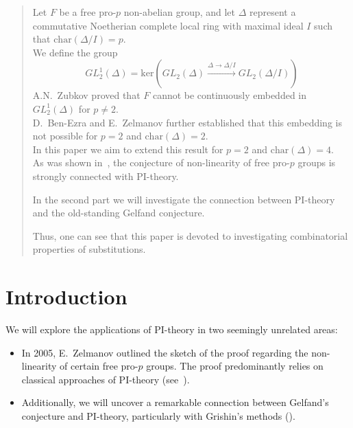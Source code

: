 \documentclass[12pt,a4paper]{article}
\begin{document}
    \begin{abstract}
        Let $F$ be a free pro-$p$ non-abelian group, and let $\Delta$ represent a commutative Noetherian complete local ring with maximal ideal $I$ such that
        $\mathrm{char}(\Delta/I)=p$.\\
        We define the group
        \[GL_2^1(\Delta) = \mathrm{ker}\left( GL_2(\Delta) \xrightarrow{\Delta\to\Delta/I} GL_2(\Delta/I) \right)\]
        A.N.\ Zubkov proved that $F$ cannot be continuously embedded in $GL_2^1(\Delta)$ for $p\neq 2$.\\
        D.\ Ben-Ezra and E.\ Zelmanov further established that this embedding is not possible for $p = 2$ and $\mathrm{char}(\Delta) = 2$.\\
        In this paper we aim to extend this result for $p=2$ and $\mathrm{char}(\Delta)=4$.\\
        As was shown in~\cite{Zelmanov1}, the conjecture of non-linearity of free pro-$p$ groups is strongly connected with PI-theory.

        In the second part we will investigate the connection between PI-theory and the old-standing Gelfand conjecture.

        Thus, one can see that this paper is devoted to investigating combinatorial properties of substitutions.
    \end{abstract}
    \tableofcontents


    \section{Introduction}

    We will explore the applications of PI-theory in two seemingly unrelated areas:

    \begin{itemize}
        \item In 2005, E.\ Zelmanov outlined the sketch of the proof regarding the non-linearity of certain free pro-$p$ groups.
        The proof predominantly relies on classical approaches of PI-theory (see~\cite{Zelmanov1}).
        \item Additionally, we will uncover a remarkable connection between Gelfand's conjecture and PI-theory, particularly with Grishin's methods (\cite{Grishin}).
    \end{itemize}


\end{document}

